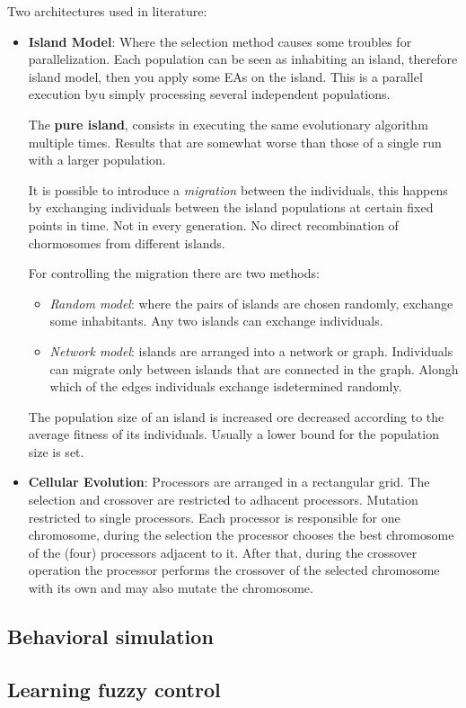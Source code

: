 \documentclass{article}
\begin{document}
Two architectures used in literature:
\begin{itemize}
    \item \textbf{Island Model}: Where the selection method causes some troubles for parallelization.
    Each population can be seen as inhabiting an island, therefore island model, then you
    apply some EAs on the island. This is a parallel execution byu simply processing several
    independent populations.
    
    The \textbf{pure island},
    consists in executing the same evolutionary algorithm multiple times. Results that are somewhat worse than
    those of a single run with a larger population.

    It is possible to introduce a \textit{migration} between the individuals, this happens by exchanging
    individuals between the island populations at certain fixed points in time. Not in every generation.
    No direct recombination of chormosomes from different islands.

    For controlling the migration there are two methods:
    \begin{itemize}
        \item \textit{Random model}: where the pairs of islands are chosen randomly, exchange
        some inhabitants. Any two islands can exchange individuals.
        \item \textit{Network model}: islands are arranged into a network or graph. Individuals
        can migrate only between islands that are connected in the graph. Alongh which of the
        edges individuals exchange isdetermined randomly.
    \end{itemize}

    The population size of an island is increased ore decreased according to the average fitness
    of its individuals. Usually a lower bound for the population size is set.

   \item \textbf{Cellular Evolution}: Processors are arranged in a rectangular grid. The
   selection and crossover are restricted to adhacent processors. Mutation restricted to single processors.
   Each processor is responsible for one chromosome, during the selection the processor chooses
   the best chromosome of the (four) processors adjacent to it. After that, during the
   crossover operation the processor performs the crossover of the selected chromosome with its own and
   may also mutate the chromosome.

\end{itemize}

\subsection{Behavioral simulation}

\subsection{Learning fuzzy control}
\end{document}
